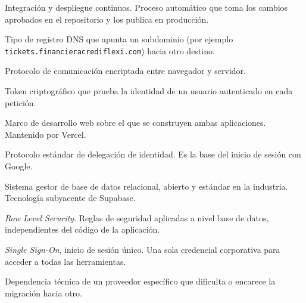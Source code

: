 \documentclass[12pt,a4paper]{article}
\begin{document}
\begin{description}[leftmargin=2.6cm, style=nextline, itemsep=0.3em]
  \item[CI/CD] Integración y despliegue continuos.
        Proceso automático que toma los cambios aprobados en el repositorio
        y los publica en producción.
  \item[CNAME] Tipo de registro DNS que apunta un subdominio
        (por ejemplo \texttt{tickets.financieracrediflexi.com}) hacia otro destino.
  \item[HTTPS] Protocolo de comunicación encriptada entre navegador y servidor.
  \item[JWT] Token criptográfico que prueba la identidad de un usuario autenticado
        en cada petición.
  \item[Next.js] Marco de desarrollo web sobre el que se construyen ambas aplicaciones.
        Mantenido por Vercel.
  \item[OAuth 2.0] Protocolo estándar de delegación de identidad.
        Es la base del inicio de sesión con Google.
  \item[PostgreSQL] Sistema gestor de base de datos relacional, abierto y estándar
        en la industria. Tecnología subyacente de Supabase.
  \item[RLS] \emph{Row Level Security}.
        Reglas de seguridad aplicadas a nivel base de datos,
        independientes del código de la aplicación.
  \item[SSO] \emph{Single Sign-On}, inicio de sesión único.
        Una sola credencial corporativa para acceder a todas las herramientas.
  \item[Vendor lock-in] Dependencia técnica de un proveedor específico
        que dificulta o encarece la migración hacia otro.
\end{description}
\end{document}
